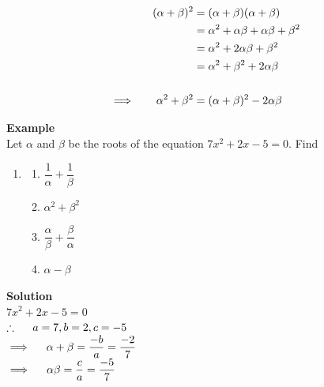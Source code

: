 \documentclass[11pt,a4paper]{article}
\begin{document}
\begin{align*}
(\alpha + \beta )^2 &= (\alpha +\beta)(\alpha +\beta)\\
                    &= \alpha^2+\alpha \beta + \alpha \beta +\beta^2\\
                    & = \alpha^2+2\alpha \beta + \beta^2\\
                    &= \alpha^2+\beta^2+2\alpha \beta\\\\
\implies \hspace{0.6cm} \alpha^2+\beta^2 & = (\alpha +\beta)^2-2\alpha \beta\\
\end{align*}


\textbf{Example}\\
Let $\alpha$ and $\beta$ be the roots of the equation $7x^2+2x-5=0$. Find
\begin{enumerate}
\item[]
\begin{enumerate}
\item $\dfrac{1}{\alpha}+\dfrac{1}{\beta}$
\item $\alpha^2+\beta^2$
\item $\dfrac{\alpha}{\beta}+\dfrac{\beta}{\alpha}$
\item $\alpha -\beta$\\
\end{enumerate}
\end{enumerate}


\textbf{Solution}\\

$7x^2+2x-5=0$\\

$\therefore\hspace{0.5cm} a=7, b=2, c=-5$\\

$\implies \hspace{0.4cm} \alpha +\beta = \dfrac{-b}{a}=\dfrac{-2}{7}$\\

$\implies \hspace{0.4cm} \alpha \beta =\dfrac{c}{a}=\dfrac{-5}{7}$\\
\end{document}
